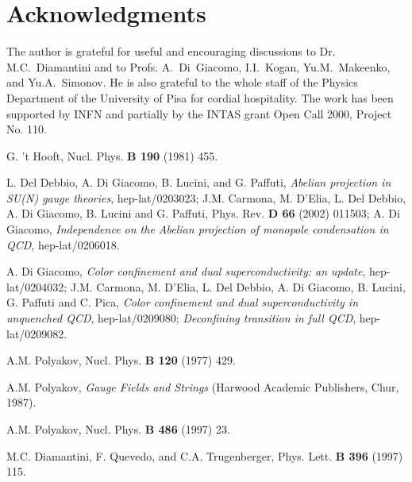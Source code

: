 \documentclass[a4paper,12pt]{article}
\begin{document}
\section{Acknowledgments}

The author is grateful for useful and encouraging discussions to Dr. M.C.~Diamantini and to Profs. A.~Di~Giacomo,
I.I.~Kogan, Yu.M.~Makeenko, and Yu.A.~Simonov.
He is also grateful to
the whole staff of the Physics Department of the
University of Pisa for cordial hospitality.
The work has been supported by INFN and partially by
the INTAS grant Open Call 2000, Project No. 110.










\begin{thebibliography}{99}

G. 't Hooft, Nucl. Phys. {\bf B 190} (1981) 455.

L. Del Debbio, A. Di Giacomo, B. Lucini, and G. Paffuti, {\it Abelian projection in SU(N) gauge theories},
hep-lat/0203023; J.M. Carmona, M. D'Elia, L. Del Debbio, A. Di Giacomo, B. Lucini and G. Paffuti,
Phys. Rev. {\bf D 66} (2002) 011503;
A. Di Giacomo, {\it Independence on the Abelian projection of monopole condensation in QCD}, hep-lat/0206018.

A. Di Giacomo, {\it Color confinement and dual
superconductivity: an update}, hep-lat/0204032;
J.M. Carmona, M. D'Elia, L. Del Debbio, A. Di Giacomo, B. Lucini, G. Paffuti and C. Pica,
{\it Color confinement and dual superconductivity in unquenched QCD},
hep-lat/0209080;
{\it Deconfining transition in full QCD},
hep-lat/0209082.

A.M. Polyakov, Nucl. Phys. {\bf B 120} (1977) 429.

A.M. Polyakov, {\it Gauge Fields and Strings} (Harwood Academic Publishers, Chur, 1987).

A.M. Polyakov, Nucl. Phys. {\bf B 486} (1997) 23.

M.C. Diamantini, F. Quevedo, and C.A. Trugenberger, Phys. Lett. {\bf B 396} (1997) 115.


\end{thebibliography}
\end{document}
